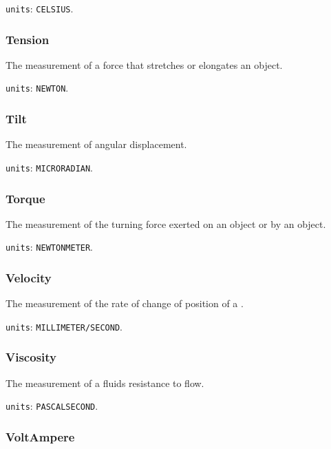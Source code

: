 \texttt{units}: \texttt{CELSIUS}.


\subsubsection{Tension}
\label{sec:Tension}



The measurement of a force that stretches or elongates an object.


\texttt{units}: \texttt{NEWTON}.


\subsubsection{Tilt}
\label{sec:Tilt}



The measurement of angular displacement.


\texttt{units}: \texttt{MICRO\textunderscore RADIAN}.


\subsubsection{Torque}
\label{sec:Torque}



The measurement of the turning force exerted on an object or by an object.


\texttt{units}: \texttt{NEWTON\textunderscore METER}.


\subsubsection{Velocity}
\label{sec:Velocity}



The measurement of the rate of change of position of a .


\texttt{units}: \texttt{MILLIMETER/SECOND}.


\subsubsection{Viscosity}
\label{sec:Viscosity}



The measurement of a fluids resistance to flow.


\texttt{units}: \texttt{PASCAL\textunderscore SECOND}.


\subsubsection{VoltAmpere}
\label{sec:VoltAmpere}



